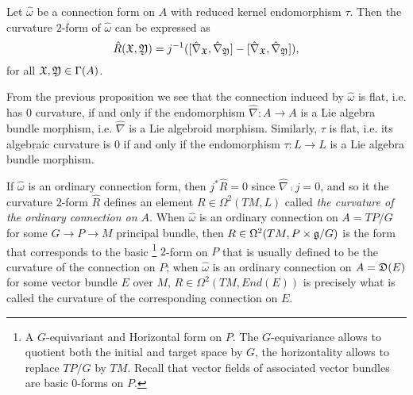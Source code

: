 \begin{proposition}
Let $\hat \omega$ be a connection form on $A$ with reduced kernel endomorphism $\tau$. Then the curvature $2$-form of $\hat \omega$ can be expressed as
\begin{equation}
    \hat R(\mathfrak{X}, \mathfrak{Y}) = j^{-1}([\hat \nabla_{\mathfrak{X}}, \hat \nabla_{\mathfrak{Y}}] - [\hat \nabla_{\mathfrak{X}}, \hat \nabla_{\mathfrak{Y}}]),
\end{equation}
for all $\mathfrak{X}, \mathfrak{Y} \in \Gamma(A)$.
\end{proposition}

\begin{remark}
From the previous proposition we see that the connection induced by $\hat \omega$ is flat, i.e. has $0$ curvature, if and only if the endomorphism $\hat \nabla: A \to A$ is a Lie algebra bundle morphism, i.e. $\hat \nabla$ is a Lie algebroid morphism. Similarly, $\tau$ is flat, i.e. its algebraic curvature is $0$ if and only if the endomorphism $\tau: L \to L$ is a Lie algebra bundle morphism. 
\end{remark}

If $\hat \omega$ is an ordinary connection form, then $j^* \hat R = 0$ since $\hat \nabla \comp j = 0$, and so it the curvature $2$-form $\hat R$ defines an element $R \in \Omega^2(TM, L)$ called \emph{the curvature of the ordinary connection on $A$}. When $\hat \omega$ is an ordinary connection on $A = TP/G$ for some $G \to P \to M$ principal bundle, then $R \in \Omega^2(TM, P \times \mathfrak{g}/G)$ is the form that corresponds to the basic
\footnote{A $G$-equivariant and Horizontal form on $P$. The $G$-equivariance allows to quotient both the initial and target space by $G$, the horizontality allows to replace $TP/G$ by $TM$.  Recall that vector fields of associated vector bundles are basic $0$-forms on $P$.} 
$2$-form on $P$ that is usually defined to be the curvature of the connection on $P$; when $\hat \omega$ is an ordinary connection on $A = \mathfrak{D}(E)$ for some vector bundle $E$ over $M$, $R \in \Omega^2(TM, End(E))$ is precisely what is called the curvature of the corresponding connection on $E$.

